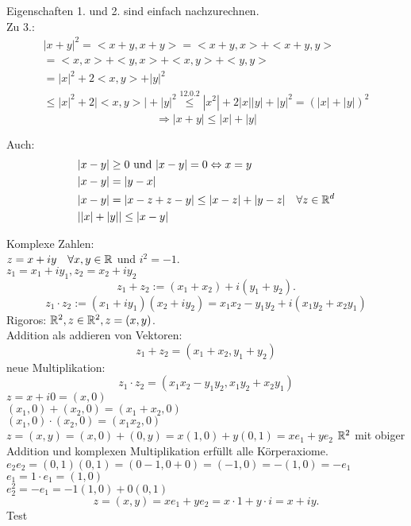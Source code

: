 \documentclass[../ana1.tex]{subfiles}
\begin{document}
\begin{bew}
	Eigenschaften 1. und 2. sind einfach nachzurechnen.\\
	Zu 3.:
	\begin{align*}
		|x+y|^2 = <x+y,x+y>=<x+y,x>+<x+y,y>\\
		= <x,x> + <y,x> + <x,y> + <y,y>\\
		=|x|^2 + 2<x,y> + |y|^2\\
		\leq |x|^2 + 2|<x,y>| + |y|^2 \overset{12.0.2}{\leq} |x^2| + 2|x||y| + |y|^2 = (|x|+|y|)^2
	\end{align*}
	\[ \Rightarrow |x+y| \leq |x| + |y| \]
\end{bew}
\begin{bem}
	Auch:
	\begin{align*}
		&|x - y| \geq 0 \text{ und } |x - y| = 0 \Leftrightarrow x = y\\
		&|x - y| = |y - x|\\
		&|x - y| = |x-z + z-y| \leq |x - z| + |y - z| \quad \forall z \in \mathbb{R}^d\\
		&||x| + |y|| \leq |x - y|
	\end{align*}
\end{bem}
Komplexe Zahlen:\\
\( z=x+iy \quad\forall x,y\in\mathbb{R} \) und \( i^2 = -1 \).\\
\( z_1 = x_1 + i y_1, z_2 = x_2 + i y_2 \)
\[ z_1 + z_2 := (x_1 + x_2) + i(y_1 + y_2). \]
\[ z_1 \cdot z_2 := (x_1 + i y_1)(x_2 + i y_2) = x_1x_2 - y_1y_2 + i(x_1y_2 + x_2y_1) \]
Rigoros: \( \mathbb{R}^2, z\in\mathbb{R}^2, z=(x,y) \).\\
Addition als addieren von Vektoren: \[ z_1 + z_2 = (x_1 + x_2, y_1 + y_2) \]
neue Multiplikation: \[ z_1 \cdot z_2 = (x_1 x_2 - y_1y_2, x_1y_2 + x_2y_1) \]
\( z = x+i 0 = (x,0) \)\\
\( (x_1,0) + (x_2,0) = (x_1+x_2,0) \)\\
\( (x_1,0)\cdot(x_2,0) = (x_1x_2,0) \)\\
\( z=(x,y) = (x,0) + (0,y) = x(1,0) + y(0,1) = x e_1 + y e_2 \)
\( \mathbb{R}^2 \) mit obiger Addition und \glqq komplexen \grqq{} Multiplikation erfüllt alle Körperaxiome.\\
\( e_2 e_2 = (0,1)(0,1) = (0-1,0 + 0) = (-1,0) = -(1,0) = -e_1 \)\\
\(e_1 = 1\cdot e_1 = (1,0) \)\\
\( e_2^2 = -e_1 = -1 (1,0) + 0(0,1) \)
\[ z = (x,y) = x e_1 + y e_2 = x \cdot 1 + y \cdot i = x + i y. \]
Test
\end{document}
